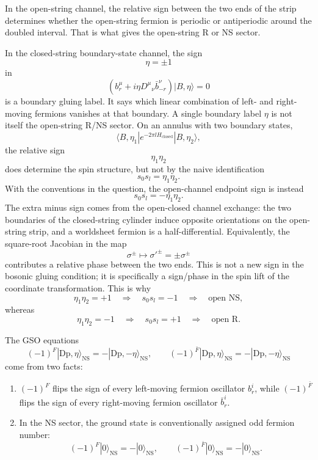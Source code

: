 \documentclass[
  10pt,
  a4paper,
  openany]{book}
\providecommand{\tightlist}{%
  \setlength{\itemsep}{0pt}\setlength{\parskip}{0pt}}
\begin{document}
In the open-string channel, the relative sign between the two ends of
the strip determines whether the open-string fermion is periodic or
antiperiodic around the doubled interval. That is what gives the
open-string R or NS sector.

In the closed-string boundary-state channel, the sign \[
\eta=\pm 1
\] in \[
\left(b_r^\mu+i\eta D^\mu{}_\nu\bar b_{-r}^\nu\right)|B,\eta\rangle=0
\] is a boundary gluing label. It says which linear combination of left-
and right-moving fermions vanishes at that boundary. A single boundary
label \(\eta\) is not itself the open-string R/NS sector. On an annulus
with two boundary states, \[
\langle B,\eta_1|e^{-2\pi lH_{\mathrm{closed}}}|B,\eta_2\rangle,
\] the relative sign \[
\eta_1\eta_2
\] does determine the spin structure, but not by the naive
identification \[
s_0s_l=\eta_1\eta_2.
\] With the conventions in the question, the open-channel endpoint sign
is instead \[
\boxed{
s_0s_l=-\eta_1\eta_2.
}
\] The extra minus sign comes from the open-closed channel exchange: the
two boundaries of the closed-string cylinder induce opposite
orientations on the open-string strip, and a worldsheet fermion is a
half-differential. Equivalently, the square-root Jacobian in the map \[
\sigma^\pm\mapsto \sigma'^\pm=\pm\sigma^\pm
\] contributes a relative phase between the two ends. This is not a new
sign in the bosonic gluing condition; it is specifically a sign/phase in
the spin lift of the coordinate transformation. This is why \[
\eta_1\eta_2=+1
\quad\Longrightarrow\quad
s_0s_l=-1
\quad\Longrightarrow\quad
\text{open NS},
\] whereas \[
\eta_1\eta_2=-1
\quad\Longrightarrow\quad
s_0s_l=+1
\quad\Longrightarrow\quad
\text{open R}.
\]

The GSO equations \[
(-1)^F|\mathrm{Dp},\eta\rangle_{\mathrm{NS}}
=
-|\mathrm{Dp},-\eta\rangle_{\mathrm{NS}},
\qquad
(-1)^{\bar F}|\mathrm{Dp},\eta\rangle_{\mathrm{NS}}
=
-|\mathrm{Dp},-\eta\rangle_{\mathrm{NS}}
\] come from two facts:

\begin{enumerate}
\def\labelenumi{\arabic{enumi}.}
\tightlist
\item
  \((-1)^F\) flips the sign of every left-moving fermion oscillator
  \(b_r^i\), while \((-1)^{\bar F}\) flips the sign of every
  right-moving fermion oscillator \(\bar b_r^i\).
\item
  In the NS sector, the ground state is conventionally assigned odd
  fermion number: \[
  (-1)^F|0\rangle_{\mathrm{NS}}
  =
  -|0\rangle_{\mathrm{NS}},
  \qquad
  (-1)^{\bar F}|0\rangle_{\mathrm{NS}}
  =
  -|0\rangle_{\mathrm{NS}}.
  \]
\end{enumerate}
\end{document}
